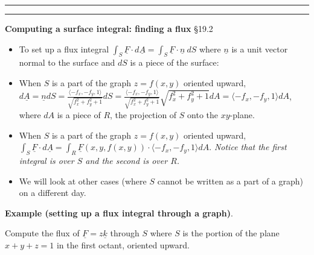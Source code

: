 \documentclass[12pt,letterpaper,noanswers]{exam}
\newcommand{\mb}[1]{\underline{#1}}
\begin{document}
\vspace{0.2cm}
\hrule
\vspace{0.2cm}
\eject
\vspace{0.2cm}
\hrule
\vspace{0.2cm}
\noindent\textbf{Computing a surface integral: finding a flux} \S 19.2
\begin{tcolorbox}
\begin{itemize}
\itemsep0em
    \item To set up a flux integral $\displaystyle \int_S \mb F\cdot d\mb A = \int_S \mb F \cdot \mb n\ dS$ where $\mb n$ is a unit vector normal to the surface and $dS$ is a piece of the surface:
    \item When $S$ is a part of the graph $z = f(x,y)$ oriented upward, $\displaystyle d\mb A = \mb n dS = \frac{\langle -f_x, -f_y,1\rangle}{\sqrt{f_x^2+f_y^2+1}} dS = \frac{\langle -f_x, -f_y,1\rangle}{\sqrt{f_x^2+f_y^2+1}}\sqrt{f_x^2+f_y^2+1} dA = \langle -f_x, -f_y,1\rangle dA$, where $dA$ is a piece of $R$, the projection of $S$ onto the $xy$-plane.  \item When $S$ is a part of the graph $z = f(x,y)$ oriented upward, $\displaystyle \int_S \mb F\cdot d\mb A = \int_R \mb F(x,y,f(x,y))\cdot \langle -f_x, -f_y, 1\rangle dA$.  \emph{Notice that the first integral is over $S$ and the second is over $R$.}
    \item We will look at other cases (where $S$ cannot be written as a part of a graph) on a different day.
\end{itemize}


\end{tcolorbox}
\noindent\textbf{Example (setting up a flux integral through a graph)}.

Compute the flux of $\mb F = z\mb k$ through $S$ where $S$ is the portion of the plane $x+y+z=1$ in the first octant, oriented upward.
\end{document}
